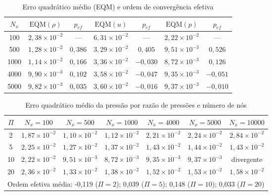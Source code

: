 \begin{table}[H]
    \centering
    \caption{Erro quadrático médio (EQM) e ordem de convergência efetiva}
    \label{tab:convergencia-eqm}
    \begin{tabular}{ccccccc}
        \toprule
        \(N_x\) & \(\mathrm{EQM}(\rho)\) & \(p_{ef}\) & \(\mathrm{EQM}(u)\) & \(p_{ef}\) & \(\mathrm{EQM}(p)\) & \(p_{ef}\) \\
        \midrule
        100 & \(2{,}38\times10^{-2}\) & --- & \(6{,}31\times10^{-2}\) & --- & \(2{,}22\times10^{-2}\) & --- \\
        500 & \(1{,}28\times10^{-2}\) & \(0{,}386\) & \(3{,}29\times10^{-2}\) & \(0{,}405\) & \(9{,}51\times10^{-3}\) & \(0{,}526\) \\
        1000 & \(1{,}14\times10^{-2}\) & \(0{,}166\) & \(3{,}36\times10^{-2}\) & \(-0{,}030\) & \(8{,}72\times10^{-3}\) & \(0{,}126\) \\
        4000 & \(9{,}90\times10^{-3}\) & \(0{,}102\) & \(3{,}58\times10^{-2}\) & \(-0{,}047\) & \(9{,}35\times10^{-3}\) & \(-0{,}051\) \\
        5000 & \(9{,}82\times10^{-3}\) & \(0{,}035\) & \(3{,}60\times10^{-2}\) & \(-0{,}016\) & \(9{,}37\times10^{-3}\) & \(-0{,}010\) \\
        \bottomrule
    \end{tabular}
\end{table}

\begin{table}[H]
    \centering
    \caption{Erro quadrático médio da pressão por razão de pressões e número de nós}
    \label{tab:erro-razao-pressoes}
    \begin{tabular}{ccccccc}
        \toprule
        \(\Pi\) & \(N_x=100\) & \(N_x=500\) & \(N_x=1000\) & \(N_x=4000\) & \(N_x=5000\) & \(N_x=10000\) \\
        \midrule
        2 & \(1{,}87\times10^{-2}\) & \(1{,}10\times10^{-2}\) & \(1{,}12\times10^{-2}\) & \(2{,}21\times10^{-2}\) & \(2{,}24\times10^{-2}\) & \(2{,}84\times10^{-2}\) \\
        5 & \(2{,}25\times10^{-2}\) & \(1{,}27\times10^{-2}\) & \(1{,}37\times10^{-2}\) & \(1{,}43\times10^{-2}\) & \(1{,}44\times10^{-2}\) & \(1{,}43\times10^{-2}\) \\
        10 & \(2{,}22\times10^{-2}\) & \(9{,}51\times10^{-3}\) & \(8{,}72\times10^{-3}\) & \(9{,}35\times10^{-3}\) & \(9{,}37\times10^{-3}\) & divergente \\
        20 & \(2{,}36\times10^{-2}\) & \(1{,}33\times10^{-2}\) & \(1{,}38\times10^{-2}\) & \(1{,}52\times10^{-2}\) & \(1{,}53\times10^{-2}\) & \(1{,}58\times10^{-2}\) \\
        \midrule
        \multicolumn{7}{l}{Ordem efetiva média: -0{,}119 (\(\Pi=2\)); 0{,}039 (\(\Pi=5\)); 0{,}148 (\(\Pi=10\)); 0{,}033 (\(\Pi=20\))} \\
        \bottomrule
    \end{tabular}
\end{table}

